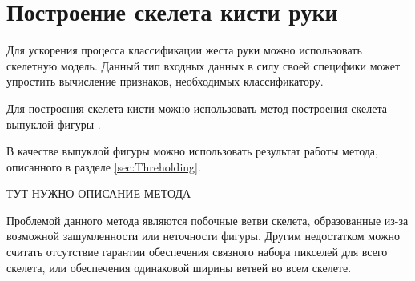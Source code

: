 \section{Построение скелета кисти руки}
\label{sec:Skeleton}

Для ускорения процесса классификации жеста руки можно использовать скелетную модель. Данный тип входных данных в силу своей специфики может упростить вычисление признаков, необходимых классификатору.

Для построения скелета кисти можно использовать метод построения скелета выпуклой фигуры \cite{DIP}. 

В качестве выпуклой фигуры можно использовать результат работы метода, описанного в разделе \ref{sec:Threholding}.

ТУТ НУЖНО ОПИСАНИЕ МЕТОДА

Проблемой данного метода являются побочные ветви скелета, образованные из-за возможной зашумленности или неточности фигуры. Другим недостатком можно считать отсутствие гарантии обеспечения связного набора пикселей для всего скелета, или обеспечения одинаковой ширины ветвей во всем скелете.
 